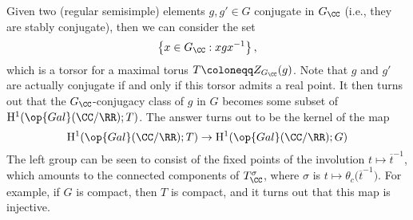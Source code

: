 \documentclass[../notes.tex]{subfiles}
\begin{document}
\begin{remark}
	Given two (regular semisimple) elements $g,g'\in G$ conjugate in $G_\CC$ (i.e., they are stably conjugate), then we can consider the set
	\[\left\{x\in G_\CC:xgx^{-1}\right\},\]
	which is a torsor for a maximal torus $T\coloneqq Z_{G_\CC}(g)$. Note that $g$ and $g'$ are actually conjugate if and only if this torsor admits a real point. It then turns out that the $G_\CC$-conjugacy class of $g$ in $G$ becomes some subset of $\mathrm H^1(\op{Gal}(\CC/\RR);T)$. The answer turns out to be the kernel of the map
	\[\mathrm H^1(\op{Gal}(\CC/\RR);T)\to\mathrm H^1(\op{Gal}(\CC/\RR);G)\]
	The left group can be seen to consist of the fixed points of the involution $t\mapsto\overline t^{-1}$, which amounts to the connected components of $T_\CC^\sigma$, where $\sigma$ is $t\mapsto\theta_c\big(\overline t^{-1}\big)$. For example, if $G$ is compact, then $T$ is compact, and it turns out that this map is injective.
\end{remark}
\end{document}
